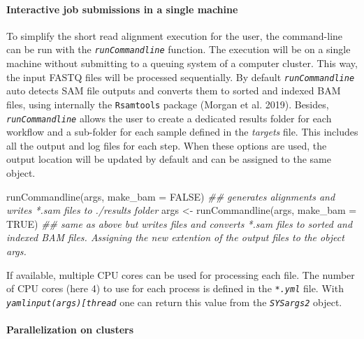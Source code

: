 \documentclass[14pt,]{article}
\newcommand{\hlstr}[1]{\textcolor[rgb]{0.251,0.627,0.251}{#1}}%
\newcommand{\hlcom}[1]{\textcolor[rgb]{0.502,0.502,0.502}{\textit{#1}}}%
\newcommand{\hlstd}[1]{\textcolor[rgb]{0.251,0.251,0.251}{#1}}%
\newcommand{\hlkwc}[1]{\textcolor[rgb]{0.251,0.251,0.251}{#1}}%
\newcommand{\hlkwd}[1]{\textcolor[rgb]{0.878,0.439,0.125}{#1}}%
\newenvironment{Shaded}{\begin{myshaded}}{\end{myshaded}}
\newcommand{\KeywordTok}[1]{\hlkwd{#1}}
\newcommand{\DataTypeTok}[1]{\hlkwc{#1}}
\newcommand{\StringTok}[1]{\hlstr{#1}}
\newcommand{\CommentTok}[1]{\hlcom{#1}}
\newcommand{\OtherTok}[1]{{#1}}
\newcommand{\NormalTok}[1]{\hlstd{#1}}
\begin{document}
\hypertarget{interactive-job-submissions-in-a-single-machine}{%
\paragraph{Interactive job submissions in a single machine}\label{interactive-job-submissions-in-a-single-machine}}

To simplify the short read alignment execution for the user, the command-line
can be run with the \emph{\texttt{runCommandline}} function.
The execution will be on a single machine without submitting to a queuing system
of a computer cluster. This way, the input FASTQ files will be processed sequentially.
By default \emph{\texttt{runCommandline}} auto detects SAM file outputs and converts them
to sorted and indexed BAM files, using internally the \texttt{Rsamtools} package
(Morgan et al. 2019). Besides, \emph{\texttt{runCommandline}} allows the user to create a dedicated
results folder for each workflow and a sub-folder for each sample
defined in the \emph{targets} file. This includes all the output and log files for each
step. When these options are used, the output location will be updated by default
and can be assigned to the same object.

\begin{Shaded}
\begin{Highlighting}[]
\KeywordTok{runCommandline}\NormalTok{(args, }\DataTypeTok{make_bam =} \OtherTok{FALSE}\NormalTok{)  }\CommentTok{## generates alignments and writes *.sam files to ./results folder }
\NormalTok{args <-}\StringTok{ }\KeywordTok{runCommandline}\NormalTok{(args, }\DataTypeTok{make_bam =} \OtherTok{TRUE}\NormalTok{)  }\CommentTok{## same as above but writes files and converts *.sam files to sorted and indexed BAM files. Assigning the new extention of the output files to the object args.}
\end{Highlighting}
\end{Shaded}

If available, multiple CPU cores can be used for processing each file. The number
of CPU cores (here 4) to use for each process is defined in the \emph{\texttt{*.yml}} file.
With \emph{\texttt{yamlinput(args){[}\textquotesingle{}thread\textquotesingle{}{]}}} one can return this value from the \emph{\texttt{SYSargs2}} object.

\hypertarget{parallelization-on-clusters-1}{%
\paragraph{Parallelization on clusters}\label{parallelization-on-clusters-1}}
\end{document}
